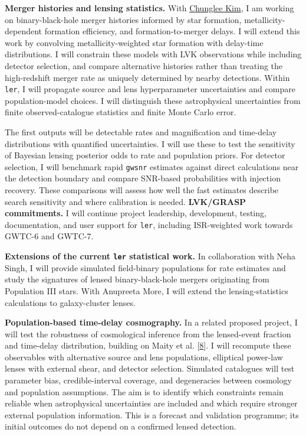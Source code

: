 \documentclass[11pt]{article}
\begin{document}
\textbf{Merger histories and lensing statistics.} With \href{https://pure.ewha.ac.kr/en/persons/chunglee-kim/}{Chunglee Kim}, I am working on binary-black-hole merger histories informed by star formation, metallicity-dependent formation efficiency, and formation-to-merger delays. I will extend this work by convolving metallicity-weighted star formation with delay-time distributions. I will constrain these models with LVK observations while including detector selection, and compare alternative histories rather than treating the high-redshift merger rate as uniquely determined by nearby detections. Within \texttt{ler}, I will propagate source and lens hyperparameter uncertainties and compare population-model choices. I will distinguish these astrophysical uncertainties from finite observed-catalogue statistics and finite Monte Carlo error.

The first outputs will be detectable rates and magnification and time-delay distributions with quantified uncertainties. I will use these to test the sensitivity of Bayesian lensing posterior odds to rate and population priors. For detector selection, I will benchmark rapid \texttt{gwsnr} estimates against direct calculations near the detection boundary and compare SNR-based probabilities with injection recovery. These comparisons will assess how well the fast estimates describe search sensitivity and where calibration is needed. \textbf{LVK/GRASP commitments.} I will continue project leadership, development, testing, documentation, and user support for \texttt{ler}, including ISR-weighted work towards GWTC-6 and GWTC-7.

\textbf{Extensions of the current \texttt{ler} statistical work.} In collaboration with Neha Singh, I will provide simulated field-binary populations for rate estimates and study the signatures of lensed binary-black-hole mergers originating from Population III stars. With Anupreeta More, I will extend the lensing-statistics calculations to galaxy-cluster lenses.

\textbf{Population-based time-delay cosmography.} In a related proposed project, I will test the robustness of cosmological inference from the lensed-event fraction and time-delay distribution, building on Maity et al. [\hyperlink{ref8}{8}]. I will recompute these observables with alternative source and lens populations, elliptical power-law lenses with external shear, and detector selection. Simulated catalogues will test parameter bias, credible-interval coverage, and degeneracies between cosmology and population assumptions. The aim is to identify which constraints remain reliable when astrophysical uncertainties are included and which require stronger external population information. This is a forecast and validation programme; its initial outcomes do not depend on a confirmed lensed detection.
\end{document}
